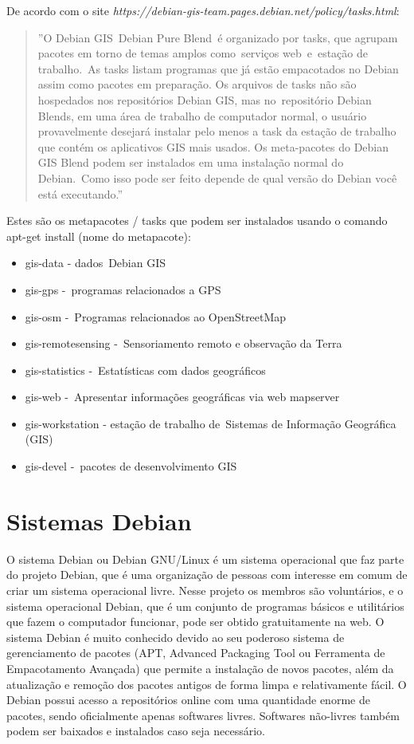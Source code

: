 De acordo com o site \textit{https://debian-gis-team.pages.debian.net/policy/tasks.html}:

\begin{quote}
	''O Debian GIS Debian Pure Blend é organizado por tasks, que agrupam pacotes em torno de temas amplos como serviços web e estação de trabalho. As tasks listam programas que já estão empacotados no Debian assim como pacotes em preparação. Os arquivos de tasks não são hospedados nos repositórios Debian GIS, mas no repositório Debian Blends, em uma área de trabalho de computador normal, o usuário provavelmente desejará instalar pelo menos a task da estação de trabalho que contém os aplicativos GIS mais usados. Os meta-pacotes do Debian GIS Blend podem ser instalados em uma instalação normal do Debian. Como isso pode ser feito depende de qual versão do Debian você está executando.''  
\end{quote}

Estes são os metapacotes / tasks que podem ser instalados usando o comando apt-get install (nome do metapacote):

\begin{itemize}
	\item gis-data - dados Debian GIS
	\item gis-gps - programas relacionados a GPS
	\item gis-osm - Programas relacionados ao OpenStreetMap
	\item gis-remotesensing - Sensoriamento remoto e observação da Terra
	\item gis-statistics - Estatísticas com dados geográficos
	\item gis-web - Apresentar informações geográficas via web mapserver
	\item gis-workstation - estação de trabalho de Sistemas de Informação Geográfica (GIS)
	\item gis-devel - pacotes de desenvolvimento GIS

\end{itemize}
\section{Sistemas Debian}
O sistema Debian ou Debian GNU/Linux é um sistema operacional que faz parte do projeto Debian, que é uma organização de pessoas com interesse em comum de criar um sistema operacional livre. Nesse projeto os membros são voluntários, e o sistema operacional Debian, que é um conjunto de programas básicos e utilitários que fazem o computador funcionar, pode ser obtido gratuitamente na web. O sistema Debian é muito conhecido devido ao seu poderoso sistema de gerenciamento de pacotes (APT, Advanced Packaging Tool ou Ferramenta de Empacotamento Avançada) que permite a instalação de novos pacotes, além da atualização e remoção dos pacotes antigos de forma limpa e relativamente fácil. O Debian possui acesso a repositórios online com uma quantidade enorme de pacotes, sendo oficialmente apenas softwares livres. Softwares não-livres também podem ser baixados e instalados caso seja necessário.

